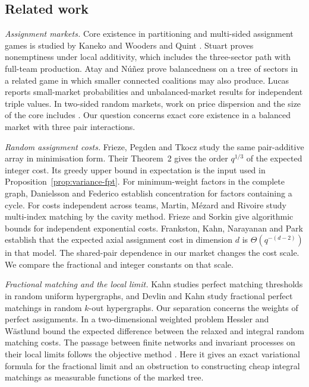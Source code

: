 \subsection{Related work}\label{sec:intro-related}

\emph{Assignment markets.} Core existence in partitioning and multi-sided assignment
games is studied by Kaneko and Wooders \cite{KanekoWooders82} and Quint \cite{Quint91}.
Stuart \cite{Stuart97} proves nonemptiness under local additivity, which includes the
three-sector path with full-team production. Atay and N\'u\~nez \cite{AtayNunez19}
prove balancedness on a tree of sectors in a related game in which smaller connected
coalitions may also produce. Lucas \cite{Lucas95} reports small-market probabilities
and unbalanced-market results for independent triple values. In two-sided random
markets, work on price dispersion and the size of the core includes
\cite{HassidimRomm15,KSS18}. Our question concerns exact core existence in a balanced
market with three pair interactions.

\emph{Random assignment costs.} Frieze, Pegden and Tkocz \cite{FPT20} study the same
pair-additive array in minimisation form. Their Theorem~2 gives the order $q^{1/3}$ of
the expected integer cost. Its greedy upper bound in expectation is the input used in
Proposition~\ref{prop:variance-fpt}. For minimum-weight factors in the complete graph,
Danielsson and Federico \cite{DanielssonFederico25} establish concentration
for factors containing a cycle. For costs independent across teams, Martin, M\'ezard
and Rivoire \cite{MMR05} study multi-index matching by the cavity method.
Frieze and Sorkin \cite{FriezeSorkin15} give algorithmic bounds for independent
exponential costs. Frankston, Kahn, Narayanan and Park \cite[Corollary~1.8]{FKNP21}
establish that the expected axial assignment cost in dimension $d$ is
$\Theta(q^{-(d-2)})$ in that model. The shared-pair dependence in our market changes
the cost scale. We compare the fractional and integer constants on that scale.

\emph{Fractional matching and the local limit.} Kahn \cite{Kahn19} studies perfect
matching thresholds in random uniform hypergraphs, and Devlin and Kahn
\cite{DevlinKahn17} study fractional perfect matchings in random $k$-out hypergraphs.
Our separation concerns the weights of perfect assignments. In a two-dimensional
weighted problem Hessler and W\"astlund \cite{HesslerWastlund08} bound the expected
difference between the relaxed and integral random matching costs. The passage
between finite networks and invariant processes on their local limits follows the
objective method \cite{Aldous92,Aldous01,AldousSteele04,AldousLyons07}. Here it gives
an exact variational formula for the fractional limit and an obstruction to constructing
cheap integral matchings as measurable functions of the marked tree.

